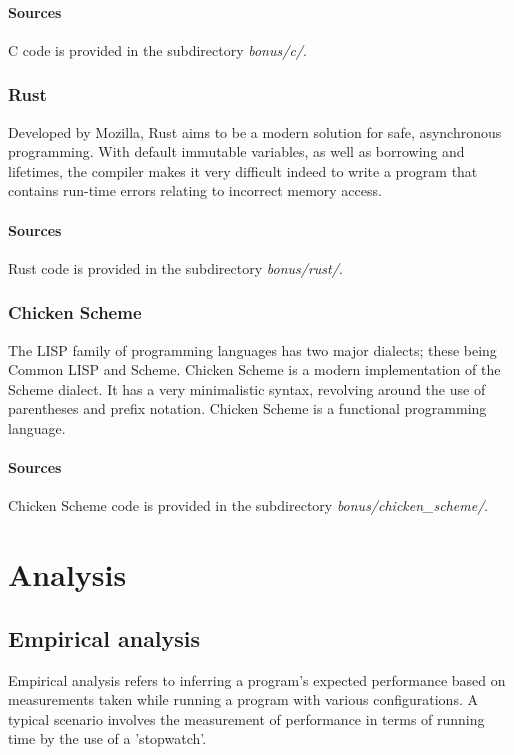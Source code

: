 \documentclass{article}
\begin{document}
\paragraph{Sources}
C code is provided in the subdirectory {\em bonus/c/}.

\subsubsection{Rust}
Developed by Mozilla, Rust aims to be a modern solution for safe, asynchronous programming.
With default immutable variables, as well as borrowing and lifetimes, the compiler makes it
very difficult indeed to write a program that contains run-time errors relating to incorrect memory access.

\paragraph{Sources}
Rust code is provided in the subdirectory {\em bonus/rust/}.

\subsubsection{Chicken Scheme}
The LISP family of programming languages has two major dialects; these being Common LISP and Scheme.
Chicken Scheme is a modern implementation of the Scheme dialect.
It has a very minimalistic syntax, revolving around the use of parentheses and prefix notation.
Chicken Scheme is a functional programming language.

\paragraph{Sources}
Chicken Scheme code is provided in the subdirectory {\em bonus/chicken\_scheme/}.


\newpage


\section{Analysis}

\subsection{Empirical analysis}
Empirical analysis refers to inferring a program's expected performance based on measurements taken while running a
program with various configurations. A typical scenario involves the measurement of performance in terms of running
time by the use of a 'stopwatch'.
\end{document}
